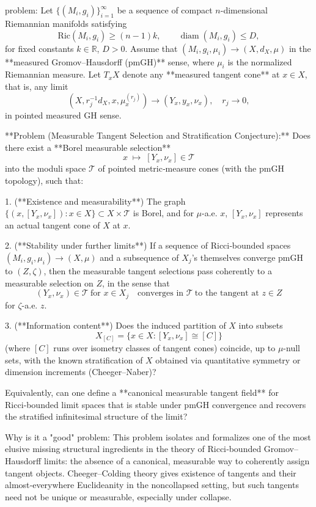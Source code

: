 problem:  
Let \(\{(M_i,g_i)\}_{i=1}^\infty\) be a sequence of compact \(n\)-dimensional Riemannian manifolds satisfying  
\[
\mathrm{Ric}(M_i,g_i)\ge (n-1)k, \qquad \operatorname{diam}(M_i,g_i)\le D,
\]
for fixed constants \(k\in\mathbb{R}\), \(D>0\).  
Assume that \((M_i,g_i,\mu_i)\to (X,d_X,\mu)\) in the **measured Gromov–Hausdorff (pmGH)** sense, where \(\mu_i\) is the normalized Riemannian measure.  
Let \(T_xX\) denote any **measured tangent cone** at \(x\in X\), that is, any limit  
\[
(X,r_j^{-1}d_X,x,\mu_x^{(r_j)}) \to (Y_x,y_x,\nu_x),\quad r_j\to 0,
\]  
in pointed measured GH sense.

**Problem (Measurable Tangent Selection and Stratification Conjecture):**  
Does there exist a **Borel measurable selection**
\[
x \;\mapsto\; [Y_x,\nu_x] \in \mathcal{T}
\]
into the moduli space \(\mathcal{T}\) of pointed metric‑measure cones (with the pmGH topology), such that:

1. (**Existence and measurability**)  
   The graph  
   \(\{(x,[Y_x,\nu_x]) : x\in X\}\subset X\times \mathcal{T}\)  
   is Borel, and for \(\mu\)-a.e. \(x\), \([Y_x,\nu_x]\) represents an actual tangent cone of \(X\) at \(x\).

2. (**Stability under further limits**)  
   If a sequence of Ricci‑bounded spaces \((M_i,g_i,\mu_i)\to (X,\mu)\) and a subsequence of \(X_j\)’s themselves converge pmGH to \((Z,\zeta)\), then the measurable tangent selections pass coherently to a measurable selection on \(Z\), in the sense that  
   \[
   (Y_x,\nu_x)\in \mathcal{T} \ \text{for } x\in X_j \quad \text{converges in } \mathcal{T} \ \text{to the tangent at } z\in Z
   \]
   for \(\zeta\)-a.e. \(z\).

3. (**Information content**)  
   Does the induced partition of \(X\) into subsets
   \[
   X_{[C]} = \{x\in X : [Y_x,\nu_x]\cong [C]\}
   \]
   (where \([C]\) runs over isometry classes of tangent cones) coincide, up to \(\mu\)-null sets, with the known stratification of \(X\) obtained via quantitative symmetry or dimension increments (Cheeger–Naber)?

Equivalently, can one define a **canonical measurable tangent field** for Ricci‑bounded limit spaces that is stable under pmGH convergence and recovers the stratified infinitesimal structure of the limit?

Why is it a "good" problem:  
This problem isolates and formalizes one of the most elusive missing structural ingredients in the theory of Ricci‑bounded Gromov–Hausdorff limits: the absence of a canonical, measurable way to coherently assign tangent objects.  Cheeger–Colding theory gives existence of tangents and their almost‑everywhere Euclideanity in the noncollapsed setting, but such tangents need not be unique or measurable, especially under collapse.  

